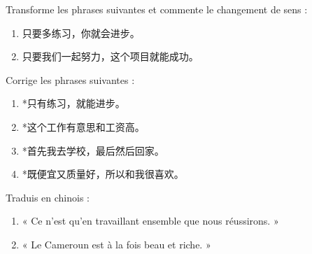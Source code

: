 \documentclass[11pt]{article}
\begin{document}
\begin{exercice}
Transforme les phrases suivantes et commente le changement de sens :
\begin{enumerate}
\item 只要多练习，你就会进步。
\item 只要我们一起努力，这个项目就能成功。
\end{enumerate}
\end{exercice}

\begin{exercice}
Corrige les phrases suivantes :
\begin{enumerate}
\item *只有练习，就能进步。
\item *这个工作有意思和工资高。
\item *首先我去学校，最后然后回家。
\item *既便宜又质量好，所以和我很喜欢。
\end{enumerate}
\end{exercice}

\begin{exercice}
Traduis en chinois :
\begin{enumerate}
\item « Ce n'est qu'en travaillant ensemble que nous réussirons. »
\item « Le Cameroun est à la fois beau et riche. »
\end{enumerate}
\end{exercice}
\end{document}
